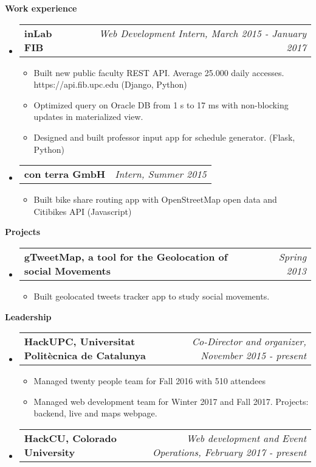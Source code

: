 \documentclass[letterpaper,10pt]{article}
\makeatletter
\newcommand{\resitem}[1]{\item #1 \vspace{-2pt}}
\newcommand{\resheading}[1]{{\large \colorbox{mygrey}{\begin{minipage}{\textwidth}{\textbf{#1 \vphantom{p\^{E}}}}\end{minipage}}}}
\newcommand{\ressubheading}[4]{
\begin{tabular*}{7.0in}{l@{\extracolsep{\fill}}r}
		\textbf{#1} & \textit{#4} \\
\end{tabular*}\vspace{-6pt}}
\makeatother
\begin{document}
\resheading{Work experience}
\begin{itemize}
\item
	\ressubheading{inLab FIB}{Barcelona, Spain}{Web Development Intern}{Web Development Intern, March 2015 - January 2017}
	\begin{itemize}
		\resitem{Built new public faculty REST API. Average 25.000 daily accesses. https://api.fib.upc.edu (Django, Python)}
  		\resitem{Optimized query on Oracle DB from 1 s to 17 ms with non-blocking updates in materialized view.}
  		\resitem{Designed and built professor input app for schedule generator. (Flask, Python) }
	\end{itemize}

\item
	\ressubheading{con terra GmbH}{Münster, Germany}{Intern}{Intern, Summer 2015}
	\begin{itemize}
		\resitem{Built bike share routing app with OpenStreetMap open data and Citibikes API (Javascript)}
	\end{itemize}

\end{itemize}

\resheading{Projects}
\begin{itemize}
\item
	\ressubheading{gTweetMap, a tool for the Geolocation of social Movements}{Barcelona, Spain}{Student}{Spring 2013}
	\begin{itemize}
		\resitem{Built geolocated tweets tracker app to study social movements.}
	\end{itemize}
\end{itemize}

\resheading{Leadership}

\begin{itemize}
\item
	\ressubheading{HackUPC, Universitat Polit\`ecnica de Catalunya}{Barcelona, Spain}{Co-Director and organizer}{Co-Director and organizer, November 2015 - present}
	\begin{itemize}
		\item Managed twenty people team for Fall 2016 with 510 attendees
		\item Managed web development team for Winter 2017 and Fall 2017. Projects: backend, live and maps webpage.
	\end{itemize}
\item 
	\ressubheading{HackCU, Colorado University}{Barcelona, Spain}{Web development and Event Operations}{Web development and Event Operations, February 2017 - present}
\end{itemize}
\end{document}
